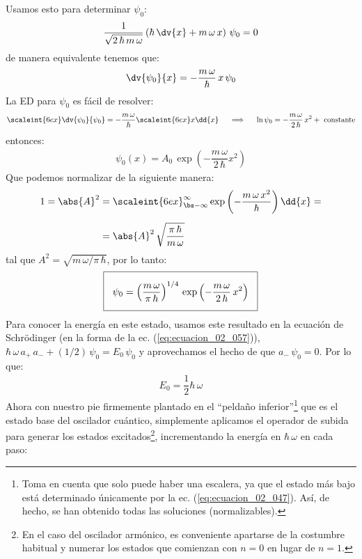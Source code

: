Usamos esto para determinar $\psi_{0}$:
\begin{align*}
\dfrac{1}{\sqrt{2 \, \hbar \, m \, \omega}} \left( \hbar \, \dv{x} + m \, \omega \, x \right) \, \psi_{0} = 0
\end{align*}
de manera equivalente tenemos que:
\begin{align*}
\dv{\psi_{0}}{x} = - \dfrac{m \, \omega}{\hbar} \, x \, \psi_{0}
\end{align*}
La ED para $\psi_{0}$ es fácil de resolver:
\begin{align*}
\scaleint{6ex} \dv{\psi_{0}}{\psi_{0}} = - \dfrac{m \, \omega}{\hbar} \scaleint{6ex} x \dd{x} \hspace{0.5cm} \Longrightarrow \hspace{0.5cm} \ln \psi_{0} = - \dfrac{m \, \omega}{2 \, \hbar} \, x^{2} + \text{ constante}
\end{align*}
entonces:
\begin{align}
\psi_{0} (x) = A_{0} \, \exp \left( - \dfrac{m \, \omega}{2 \, \hbar} x^{2} \right)
\end{align}
Que podemos normalizar de la siguiente manera:
\begin{align*}
1 = \abs{A}^{2} &= \scaleint{6ex}_{\bs -\infty}^{\infty} \exp \left( - \dfrac{m \, \omega \, x^{2}}{\hbar} \right) \dd{x} = \\[0.5em]
&= \abs{A}^{2} \, \sqrt{\dfrac{\pi \, \hbar}{m \, \omega}}
\end{align*}
tal que $A^{2} = \sqrt{m \, \omega / \pi \, \hbar}$, por lo tanto:
\begin{align}
\setlength{\fboxsep}{3\fboxsep}\boxed{
\psi_{0} = \left( \dfrac{m \, \omega}{\pi \, \hbar} \right)^{1/4} \, \exp \left( - \dfrac{m \, \omega}{2 \, \hbar} \, x^{2} \right)
}
\label{eq:ecuacion_02_059}
\end{align}
Para conocer la energía en este estado, usamos este resultado en la ecuación de Schrödinger (en la forma de la ec. (\ref{eq:ecuacion_02_057})), $\hbar \, \omega \, a_{+} \, a_{-} + (1/2) \, \psi_{0}  = E_{0} \, \psi_{0}$ y aprovechamos el hecho de que $a_{-} \, \psi_{0} = 0$. Por lo que:
\begin{align}
E_{0} = \dfrac{1}{2} \hbar \, \omega
\label{eq:ecuacion_02_060}
\end{align}
Ahora con nuestro pie firmemente plantado en el \enquote{peldaño inferior}\footnote{Toma en cuenta que solo puede haber una escalera, ya que el estado más bajo está determinado únicamente por la ec. (\ref{eq:ecuacion_02_047}). Así, de hecho, se han obtenido todas las soluciones (normalizables).} que es el estado base del oscilador cuántico, simplemente aplicamos el operador de subida para generar los estados excitados\footnote{ En el caso del oscilador armónico, es conveniente apartarse de la costumbre habitual y numerar los estados que comienzan con $n = 0$ en lugar de $n = 1$.}, incrementando la energía en $\hbar \, \omega$ en cada paso:
